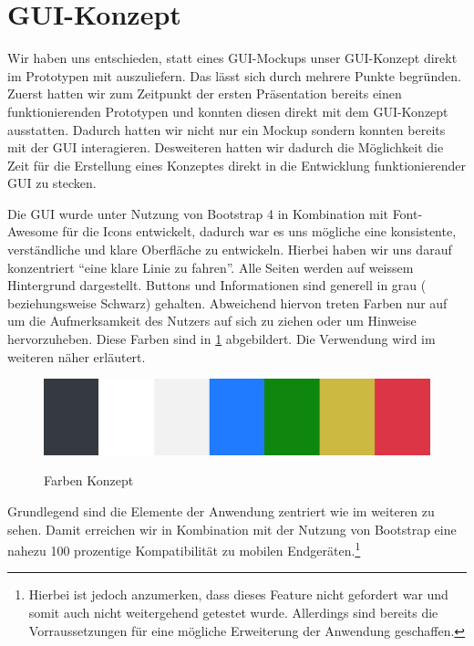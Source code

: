 
\section{GUI-Konzept}

Wir haben uns entschieden, statt eines GUI-Mockups unser GUI-Konzept direkt im Prototypen mit auszuliefern.
Das lässt sich durch mehrere Punkte begründen.
Zuerst hatten wir zum Zeitpunkt der ersten Präsentation bereits einen funktionierenden Prototypen und konnten diesen direkt mit dem GUI-Konzept ausstatten. Dadurch hatten wir nicht nur ein Mockup sondern konnten bereits mit der GUI interagieren.
Desweiteren hatten wir dadurch die Möglichkeit die Zeit für die Erstellung eines Konzeptes direkt in die Entwicklung funktionierender GUI zu stecken.

Die GUI wurde unter Nutzung von Bootstrap 4 in Kombination mit Font-Awesome für die Icons entwickelt, dadurch war es uns mögliche eine konsistente, verständliche und klare Oberfläche zu entwickeln.
Hierbei haben wir uns darauf konzentriert \enquote{eine klare Linie zu fahren}. Alle Seiten werden auf weissem Hintergrund dargestellt. Buttons und Informationen sind generell in grau ( beziehungsweise Schwarz) gehalten. 
Abweichend hiervon treten Farben nur auf um die Aufmerksamkeit des Nutzers auf sich zu ziehen oder um Hinweise hervorzuheben. Diese Farben sind in \cref{fig:farbmuster} abgebildert. Die Verwendung wird im weiteren näher erläutert.

\begin{figure}[hbt]
\centering
\begin{minipage}[t]{1\textwidth}
    \caption{Farben Konzept}
    \includegraphics[width=1\textwidth]{img/farbmuster.png}\\
    \label{fig:farbmuster}
\end{minipage}
\end{figure}


Grundlegend sind die Elemente der Anwendung zentriert wie im weiteren zu sehen. Damit erreichen wir in Kombination mit der Nutzung von Bootstrap eine nahezu 100 prozentige Kompatibilität zu mobilen Endgeräten.\footnote{Hierbei ist jedoch anzumerken, dass dieses Feature nicht gefordert war und somit auch nicht weitergehend getestet wurde. Allerdings sind bereits die Vorraussetzungen für eine mögliche Erweiterung der Anwendung geschaffen.}

